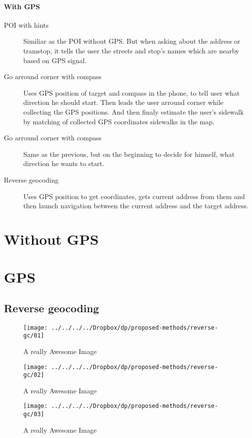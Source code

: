 \documentclass[11pt,oneside,a4paper]{book}
\begin{document}
			\paragraph{With GPS}
				\begin{description}
									
					\item [POI with hints]
					Similiar as the POI without GPS. But when asking about the address or tramstop, it tells the user the streets and stop's names which are nearby based on GPS signal.
					\item [Go arround corner with compass]
					Uses GPS position of target and compass in the phone, to tell user what direction he should start. Then leads the user arround corner while collecting the GPS positions. And then finaly estimate the user's sidewalk by matching of collected GPS coordinates sidewalks in the map.
					\item [Go arround corner with compass]
					Same as the previous, but on the beginning to decide for himself, what direction he wants to start.
					\item [Reverse geocoding]
					Uses GPS position to get coordinates, gets current address from them and then launch navigation between the current address and the target address.
				\end{description}
		\section{Without GPS}
		\section{GPS}
			\subsection{Reverse geocoding}
		
			\begin{figure}[!htb]
				\texttt{[image: ../../../../Dropbox/dp/proposed-methods/reverse-gc/01]}
				\caption{A really Awesome Image}\label{fig:awesome_image1}
				\endminipage\hfill
				\texttt{[image: ../../../../Dropbox/dp/proposed-methods/reverse-gc/02]}
				\caption{A really Awesome Image}\label{fig:awesome_image2}
				\endminipage\hfill
				\texttt{[image: ../../../../Dropbox/dp/proposed-methods/reverse-gc/03]}
				\caption{A really Awesome Image}\label{fig:awesome_image3}
				\endminipage
			\end{figure}
	
\end{document}
